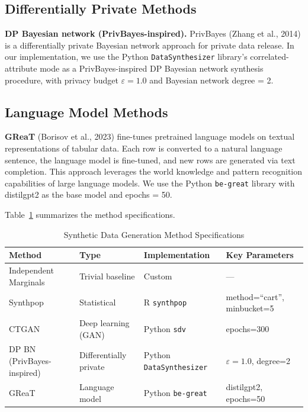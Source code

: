 \documentclass[12pt,a4paper]{article}
\begin{document}
\subsection{Differentially Private Methods}

\textbf{DP Bayesian network (PrivBayes-inspired).} PrivBayes (Zhang et al., 2014) is a differentially private Bayesian network approach for private data release. In our implementation, we use the Python \texttt{DataSynthesizer} library's correlated-attribute mode as a PrivBayes-inspired DP Bayesian network synthesis procedure, with privacy budget $\varepsilon = 1.0$ and Bayesian network degree = 2.

\subsection{Language Model Methods}

\textbf{GReaT} (Borisov et al., 2023) fine-tunes pretrained language models on textual representations of tabular data. Each row is converted to a natural language sentence, the language model is fine-tuned, and new rows are generated via text completion. This approach leverages the world knowledge and pattern recognition capabilities of large language models. We use the Python \texttt{be-great} library with distilgpt2 as the base model and epochs = 50.

Table~\ref{tab:methods} summarizes the method specifications.

\begin{table}[htbp]
\centering
\caption{Synthetic Data Generation Method Specifications}
\label{tab:methods}
\begin{tabular}{@{}llll@{}}
\toprule
\textbf{Method} & \textbf{Type} & \textbf{Implementation} & \textbf{Key Parameters} \\
\midrule
Independent Marginals & Trivial baseline & Custom & --- \\
Synthpop & Statistical & R \texttt{synthpop} & method=``cart'', minbucket=5 \\
CTGAN & Deep learning (GAN) & Python \texttt{sdv} & epochs=300 \\
DP BN (PrivBayes-inspired) & Differentially private & Python \texttt{DataSynthesizer} & $\varepsilon=1.0$, degree=2 \\
GReaT & Language model & Python \texttt{be-great} & distilgpt2, epochs=50 \\
\bottomrule
\end{tabular}
\end{table}
\end{document}
